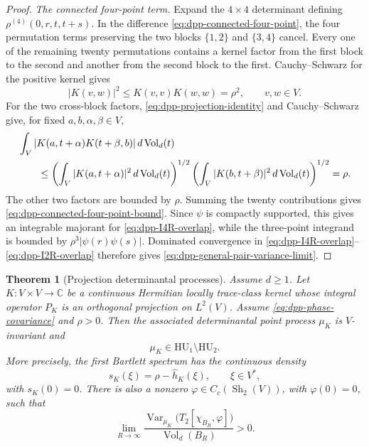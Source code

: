 \documentclass[11pt,reqno,a4paper]{amsart}
\numberwithin{equation}{section}
\theoremstyle{compact}
\newtheorem{theorem}{Theorem}[section]
\theoremstyle{definition}
\theoremstyle{definition}
\newcommand{\HU}{\mathrm{HU}}
\newcommand{\Var}{\operatorname{Var}}
\newcommand{\Vol}{\operatorname{Vol}}
\newcommand{\Sh}{\operatorname{Sh}}
\begin{document}
\begin{proof}
\smallskip\noindent\emph{The connected four-point term.}
Expand the $4\times4$ determinant defining
$\rho^{(4)}(0,r,t,t+s)$.  In the difference
\eqref{eq:dpp-connected-four-point}, the four permutation terms preserving the
two blocks $\{1,2\}$ and $\{3,4\}$ cancel.  Every one of the remaining
twenty permutations contains a kernel factor from the first block to the
second and another from the second block to the first.  Cauchy--Schwarz for
the positive kernel gives
\begin{equation}\label{eq:dpp-pointwise-kernel-bound}
  |K(v,w)|^2\leq K(v,v)K(w,w)=\rho^2,
  \qquad v,w\in V.
\end{equation}
For the two cross-block factors, \eqref{eq:dpp-projection-identity} and
Cauchy--Schwarz give, for fixed $a,b,\alpha,\beta\in V$,
\begin{align}\label{eq:dpp-cross-block-bound}
  &\int_V |K(a,t+\alpha)K(t+\beta,b)|\,d\Vol_d(t)\notag\\
  &\qquad\leq
  \left(\int_V|K(a,t+\alpha)|^2\,d\Vol_d(t)\right)^{1/2}
  \left(\int_V|K(b,t+\beta)|^2\,d\Vol_d(t)\right)^{1/2}
  =\rho.
\end{align}
The other two factors are bounded by $\rho$.  Summing the twenty
contributions gives \eqref{eq:dpp-connected-four-point-bound}.  Since $\psi$ is
compactly supported, this gives an integrable majorant for
\eqref{eq:dpp-I4R-overlap}, while the three-point integrand is bounded by
$\rho^3|\psi(r)\psi(s)|$.  Dominated convergence in
\eqref{eq:dpp-I4R-overlap}--\eqref{eq:dpp-I2R-overlap} therefore gives
\eqref{eq:dpp-general-pair-variance-limit}.


\end{proof}


\begin{theorem}[Projection determinantal processes]
\label{thm:projection-dpp-hu1-not-hu2}
Assume $d\geq1$.  Let $K:V\times V\to\mathbb C$ be a continuous Hermitian locally trace-class
kernel whose integral operator $P_K$ is an orthogonal projection on $L^2(V)$.
Assume \eqref{eq:dpp-phase-covariance} and $\rho>0$.  Then the associated
determinantal point process $\mu_K$ is $V$-invariant and
\begin{equation}\label{eq:dpp-hierarchy-separation}
  \mu_K\in\HU_1\setminus\HU_2.
\end{equation}
More precisely, the first Bartlett spectrum has the continuous density
\begin{equation}\label{eq:dpp-first-bartlett-density}
  s_K(\xi)=\rho-\widehat h_K(\xi),
  \qquad \xi\in V^*,
\end{equation}
with $s_K(0)=0$.  There is also a nonzero
$\varphi\in C_c(\Sh_2(V))$, with $\varphi(0)=0$, such that
\begin{equation}\label{eq:dpp-positive-pair-volume}
  \lim_{R\to\infty}
  \frac{\Var_{\mu_K}\big(T_2[\chi_{B_R},\varphi]\big)}
       {\Vol_d(B_R)}>0.
\end{equation}
\end{theorem}
\end{document}
